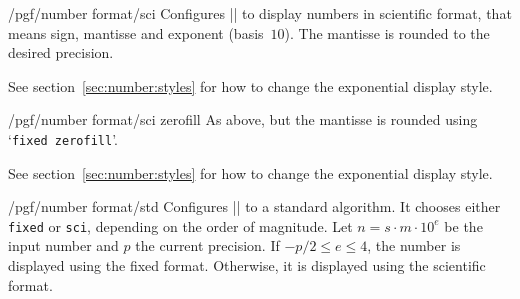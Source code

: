 {\begin{key}{/pgf/number format/sci}
Configures |\pgfmathprintnumber| to display numbers in scientific format, that means sign, mantisse and exponent (basis~$10$). The mantisse is rounded to the desired precision.

\begin{codeexample}[]
\hspace{1em}
\hspace{1em}
\hspace{1em}
\hspace{1em}
\end{codeexample}

See section~\ref{sec:number:styles} for how to change the exponential display style.
\end{key}

\begin{key}{/pgf/number format/sci zerofill}
As above, but the mantisse is rounded using `\texttt{fixed zerofill}'.

\begin{codeexample}[]
\hspace{1em}
\hspace{1em}
\hspace{1em}
\hspace{1em}
\end{codeexample}

See section~\ref{sec:number:styles} for how to change the exponential display style.
\end{key}


\begin{key}{/pgf/number format/std}
Configures |\pgfmathprintnumber| to a standard algorithm. It chooses either \texttt{fixed} or \texttt{sci}, depending on the order of magnitude. Let $n=s \cdot m \cdot 10^e$ be the input number and $p$ the current precision. If $-p/2 \le e \le 4$, the number is displayed using the fixed format. Otherwise, it is displayed using the scientific format. 

\begin{codeexample}[]
\hspace{1em}
\hspace{1em}
\hspace{1em}
\hspace{1em}
\end{codeexample}
\end{key}

}
